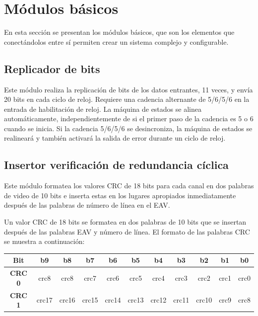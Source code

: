 \section{Módulos básicos}

En esta sección se presentan los módulos básicos, que son los elementos que
conectándolos entre sí permiten crear un sistema complejo y configurable.

\subsection{Replicador de bits}

  Este módulo realiza la replicación de bits de los datos entrantes, 11 veces,
  y envía 20 bits en cada ciclo de reloj. Requiere una cadencia
  alternante de 5/6/5/6 en la entrada de habilitación de reloj. La máquina
  de estados se alinea automáticamente, independientemente de si el primer
  paso de la cadencia es 5 o 6 cuando se inicia. Si la cadencia 5/6/5/6 se
  desincroniza, la máquina de estados se realineará y también activará la
  salida de error durante un ciclo de reloj.

\subsection{Insertor verificación de redundancia cíclica}

Este módulo formatea los valores CRC de 18 bits para cada canal en dos palabras
de video de 10 bits e inserta estas en los lugares apropiados inmediatamente
después de las palabras de número de línea en el EAV\@.

Un valor CRC de 18 bits se formatea en dos palabras de 10 bits que se insertan
después de las palabras EAV y número de línea. El formato de las palabras CRC
se muestra a continuación:

\begin{center}
  \begin{tabular}{|c|c|c|c|c|c|c|c|c|c|c|}
    \hline
    \textbf{Bit} & b9 & b8 & b7 & b6 & b5 & b4 & b3 & b2 & b1 & b0 \\
    \hline
    \textbf{CRC 0} & crc8 & crc8 & crc7 & crc6 & crc5 & crc4 & crc3 & crc2 & crc1 & crc0 \\
    \hline
    \textbf{CRC 1} & crc17 & crc16 & crc15 & crc14 & crc13 & crc12 & crc11 & crc10 & crc9 & crc8 \\
    \hline
  \end{tabular}
\end{center}

